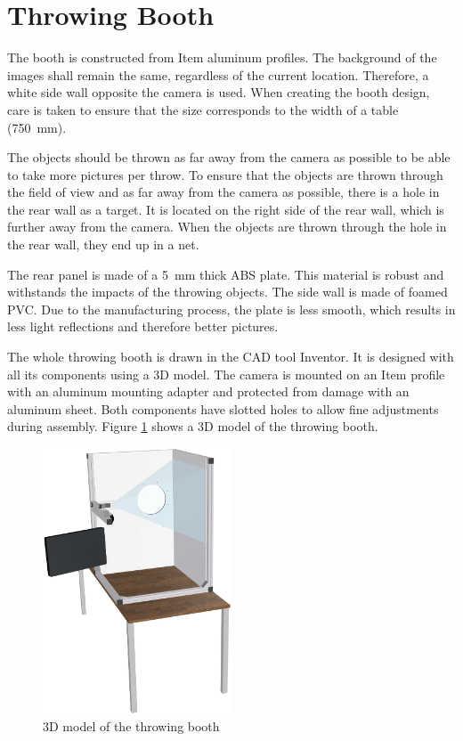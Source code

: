 \section{Throwing Booth}
\label{sec:hardware:throwing_booth}

The booth is constructed from Item aluminum profiles.
The background of the images shall remain the same, regardless of the current location.
Therefore, a white side wall opposite the camera is used.
When creating the booth design, care is taken to ensure that the size corresponds to the width of a table (\SI{750}{mm}).

The objects should be thrown as far away from the camera as possible to be able to take more pictures per throw.
To ensure that the objects are thrown through the field of view and as far away from the camera as possible, there is a hole in the rear wall as a target.
It is located on the right side of the rear wall, which is further away from the camera.
When the objects are thrown through the hole in the rear wall, they end up in a net.

The rear panel is made of a \SI{5}{mm} thick ABS plate.
This material is robust and withstands the impacts of the throwing objects.
The side wall is made of foamed PVC.
Due to the manufacturing process, the plate is less smooth, which results in less light reflections and therefore better pictures.

The whole throwing booth is drawn in the CAD tool Inventor. It is designed with all its components using a 3D model.
The camera is mounted on an Item profile with an aluminum mounting adapter and protected from damage with an aluminum sheet.
Both components have slotted holes to allow fine adjustments during assembly.
Figure \ref{fig:booth} shows a 3D model of the throwing booth. 

\begin{figure}[h]
	\centering
	\includegraphics[width=0.5\textwidth]{graphics/top_assembly.png}
	\caption{3D model of the throwing booth}
	\label{fig:booth}
\end{figure}
